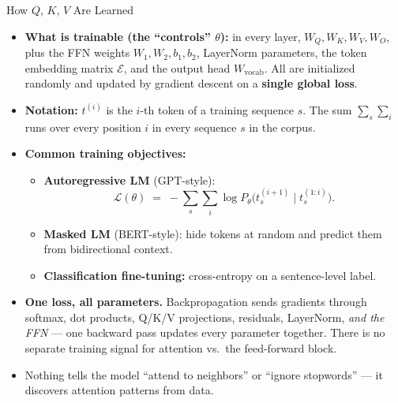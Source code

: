 \begin{frame}{How $Q$, $K$, $V$ Are Learned}
\begin{itemize}
\item \textbf{What is trainable (the ``controls'' $\theta$):} in every layer, $W_{Q}, W_{K}, W_{V}, W_{O}$, plus the FFN weights $W_{1}, W_{2}, b_{1}, b_{2}$, LayerNorm parameters, the token embedding matrix $\mathcal{E}$, and the output head $W_{\text{vocab}}$. All are initialized randomly and updated by gradient descent on a \textbf{single global loss}.

\medskip
\item \textbf{Notation:} $t^{(i)}$ is the $i$-th token of a training sequence $s$. The sum $\sum_{s}\sum_{i}$ runs over every position $i$ in every sequence $s$ in the corpus.

\medskip
\item \textbf{Common training objectives:}
\begin{itemize}
    \item \textbf{Autoregressive LM} (GPT-style):
    \[
       \mathcal{L}(\theta) \;=\; -\sum_{s}\sum_{i} \log P_{\theta}\bigl(t_{s}^{(i+1)} \mid t_{s}^{(1:i)}\bigr).
    \]
    \item \textbf{Masked LM} (BERT-style): hide tokens at random and predict them from bidirectional context.
    \item \textbf{Classification fine-tuning:} cross-entropy on a sentence-level label.
\end{itemize}

\medskip
\item \textbf{One loss, all parameters.} Backpropagation sends gradients through softmax, dot products, Q/K/V projections, residuals, LayerNorm, \emph{and the FFN} --- one backward pass updates every parameter together. There is no separate training signal for attention vs.\ the feed-forward block.

\medskip
\item Nothing tells the model ``attend to neighbors'' or ``ignore stopwords'' --- it discovers attention patterns from data.
\end{itemize}
\end{frame}

